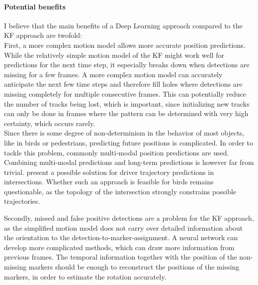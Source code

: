 \documentclass[12pt,a4paper]{article}
\begin{document}
\paragraph{Potential benefits}
I believe that the main benefits of a Deep Learning approach  compared to the KF approach are twofold: \\
First, a more complex motion model allows more accurate position predictions. While the relatively simple motion model of the KF might work well for predictions for the next time step, it especially breaks down when detections are missing for a few frames. A more complex motion model can accurately anticipate the next few time steps and therefore fill holes where detections are missing completely for multiple consecutive frames. This can potentially reduce the number of tracks being lost, which is important, since initializing new tracks can only be done in frames where the pattern can be determined with very high certainty, which occurs rarely.\\
Since there is some degree of non-determinism in the behavior of most objects, like in birds or pedestrians, predicting future positions is complicated. In order to tackle this problem, commonly multi-modal position predictions are used. Combining multi-modal predictions and long-term predictions is however far from trivial. \cite{multi_modal} present a possible solution for driver trajectory predictions in intersections. Whether such an approach is feasible for birds remains questionable, as the topology of the intersection strongly constrains possible trajectories.

Secondly, missed and false positive detections are a problem for the KF approach, as the simplified motion model does not carry over detailed information about the orientation to the detection-to-marker-assignment. A neural network can develop more complicated methods, which can draw more information from previous frames. The temporal information together with the position of the non-missing markers should be enough to reconstruct the positions of the missing markers, in order to estimate the rotation accurately.
\end{document}
